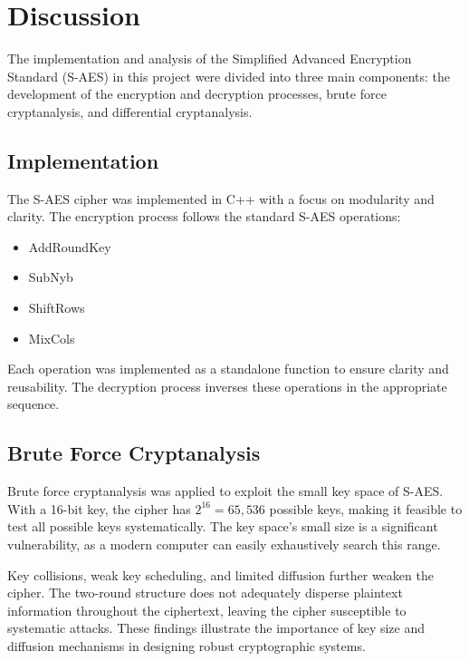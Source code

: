 \documentclass{article}
\begin{document}

\section{Discussion}
The implementation and analysis of the Simplified Advanced Encryption Standard (S-AES) in this project were divided into three main components: the development of the encryption and decryption processes, brute force cryptanalysis, and differential cryptanalysis.

\subsection{Implementation}
The S-AES cipher was implemented in C++ with a focus on modularity and clarity. The encryption process follows the standard S-AES operations:
\begin{itemize}
    \item AddRoundKey
    \item SubNyb
    \item ShiftRows
    \item MixCols
\end{itemize}
Each operation was implemented as a standalone function to ensure clarity and reusability. The decryption process inverses these operations in the appropriate sequence.

\subsection{Brute Force Cryptanalysis}
Brute force cryptanalysis was applied to exploit the small key space of S-AES. With a 16-bit key, the cipher has \(2^{16} = 65,536\) possible keys, making it feasible to test all possible keys systematically. The key space's small size is a significant vulnerability, as a modern computer can easily exhaustively search this range.

Key collisions, weak key scheduling, and limited diffusion further weaken the cipher. The two-round structure does not adequately disperse plaintext information throughout the ciphertext, leaving the cipher susceptible to systematic attacks. These findings illustrate the importance of key size and diffusion mechanisms in designing robust cryptographic systems.

\newpage
\end{document}
